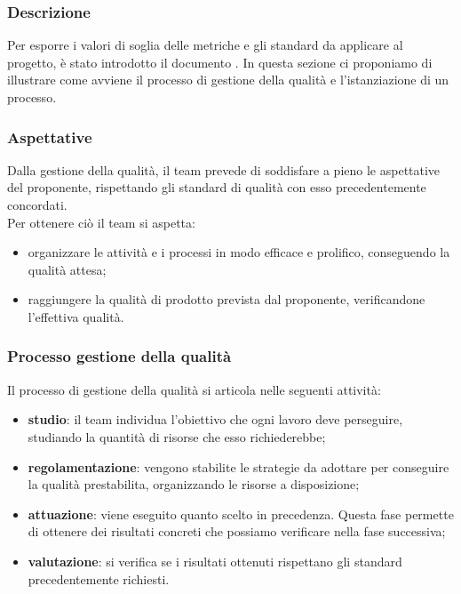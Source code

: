 \subsubsection{Descrizione}
Per esporre i valori di soglia delle metriche e gli standard da applicare al progetto, è stato introdotto il documento .
In questa sezione ci proponiamo di illustrare come avviene il processo di gestione della qualità e l'istanziazione di un processo.

\subsubsection{Aspettative}
Dalla gestione della qualità, il team prevede di soddisfare a pieno le aspettative del proponente, rispettando gli standard di qualità con esso  precedentemente concordati.\\
Per ottenere ciò il team si aspetta:
\begin{itemize}
    \item organizzare le attività e i processi in modo efficace e prolifico, conseguendo la qualità attesa;
    \item raggiungere la qualità di prodotto prevista dal proponente, verificandone l'effettiva qualità.
\end{itemize}


\subsubsection{Processo gestione della qualità}
Il processo di gestione della qualità si articola nelle seguenti attività:
\begin{itemize}
    \item\textbf{studio}: il team individua l'obiettivo che ogni lavoro deve perseguire, studiando la quantità di risorse che esso richiederebbe;
    \item \textbf{regolamentazione}: vengono stabilite le strategie da adottare per conseguire la qualità prestabilita, organizzando le risorse a disposizione;
    \item\textbf{attuazione}: viene eseguito quanto scelto in precedenza. Questa fase permette di ottenere dei risultati concreti che possiamo verificare nella fase successiva;
    \item\textbf{valutazione}: si verifica se i risultati ottenuti rispettano gli standard precedentemente richiesti.
\end{itemize}


